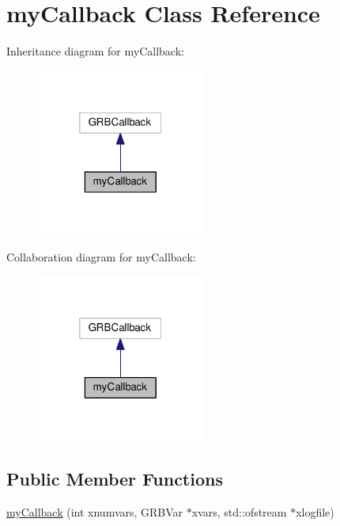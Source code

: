 \hypertarget{classmyCallback}{}\section{my\+Callback Class Reference}
\label{classmyCallback}


Inheritance diagram for my\+Callback\+:
\nopagebreak
\begin{figure}[H]
\begin{center}
\leavevmode
\includegraphics[width=157pt]{classmyCallback__inherit__graph}
\end{center}
\end{figure}


Collaboration diagram for my\+Callback\+:
\nopagebreak
\begin{figure}[H]
\begin{center}
\leavevmode
\includegraphics[width=157pt]{classmyCallback__coll__graph}
\end{center}
\end{figure}
\subsection*{Public Member Functions}
\begin{DoxyCompactItemize}
\item 
\hyperlink{classmyCallback_a9bcd05e872b57296b5de496e84d13c74}{my\+Callback} (int xnumvars, G\+R\+B\+Var $\ast$xvars, std\+::ofstream $\ast$xlogfile)
\end{DoxyCompactItemize}
